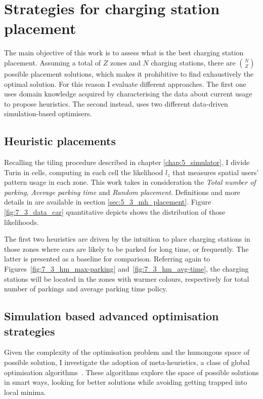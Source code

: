\section{Strategies for charging station placement}
\label{sec:7_5_placement}

The main objective of this work is to assess what is the best charging station placement. Assuming a total of $Z$ zones and $N$ charging stations, there are ${N}\choose{Z}$ possible placement solutions, which makes it prohibitive to find exhaustively the optimal solution. For this reason I evaluate different approaches. The first one uses domain knowledge acquired by characterising the data about current usage to propose heuristics. The second instead, uses two different data-driven simulation-based optimisers.

\subsection{Heuristic placements}

Recalling the tiling procedure described in chapter \ref{chap:5_simulator}, I divide Turin in cells, computing in each cell the likelihood $l_z$ that measures spatial users' pattern usage in each zone. This work takes in consideration the \textit{Total number of parking}, \textit{Average parking time} and \textit{Random placement}. Definitions and more details in are available in section \ref{sec:5_3_mh_placement}. Figure \ref{fig:7_3_data_car} quantitative depicts shows the distribution of those likelihoods. 

The first two heuristics are driven by the intuition to place charging stations in those zones where cars are likely to be parked for long time, or frequently. The latter is presented as a baseline for comparison. Referring again to Figures~\ref{fig:7_3_hm_max-parking} and~\ref{fig:7_3_hm_avg-time}, the charging stations will be located in the zones with warmer colours, respectively for total number of parkings and average parking time policy.

\subsection{Simulation based advanced optimisation strategies}\label{sec:optmizers}

Given the complexity of the optimisation problem and the humongous space of possible solution, I investigate the adoption of meta-heuristics, a class of global optimisation algorithms~\cite{RA09}. These algorithms explore the space of possible solutions in smart ways, looking for better solutions while avoiding getting trapped into local minima.

